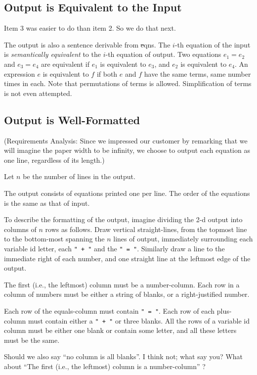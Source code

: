 \documentclass[12pt]{article}
\def\bnf{\st}
\begin{document}
\subsection{Output is Equivalent to the Input}

{\small Item 3 was easier to do than item 2.  So we do that
next.}

The output is also a sentence derivable from {\bnf eqns}.  The $i$-th
equation of the input is {\sl semantically equivalent} to the $i$-th
equation of output.  Two equations $e_1 = e_2$ and $e_3 = e_4$ are
equivalent if $e_1$ is equivalent to $e_3$, and $e_2$ is equivalent to
$e_4$.  An expression $e$ is equivalent to $f$ if both $e$ and $f$
have the same terms, same number times in each.  Note that
permutations of terms is allowed.  Simplification of terms is not even
attempted.


\subsection{Output is Well-Formatted}

(Requirements Analysis: Since we impressed our customer by remarking
that we will imagine the paper width to be infinity, we choose to
output each equation as one line, regardless of its length.)

Let $n$ be the number of lines in the output.

The output consists of equations printed one per line.  The
order of the equations is the same as that of input.

To describe the formatting of the output, imagine dividing the 2-d
output into columns of $n$ rows as follows.  Draw vertical
straight-lines, from the topmost line to the bottom-most spanning the
$n$ lines of output, immediately surrounding each variable id letter,
each \verb|" + "| and the \verb|" = "|.  Similarly draw a line to the
immediate right of each number, and one straight line at the leftmost
edge of the output.

The first (i.e., the leftmost) column must be a number-column.  Each
row in a column of numbers must be either a string of blanks, or a
right-justified number.

Each row of the equals-column must contain \verb|" = "|.  Each row of
each plus-column must contain either a \verb|" + "| or three blanks.
All the rows of a variable id column must be 
either one blank or contain some letter, and all these letters
must be the same.

{\small Should we also say ``no column is all blanks''.  I think not;
what say you?  What about ``The first (i.e., the leftmost) column is a
number-column'' ?  }
\end{document}
